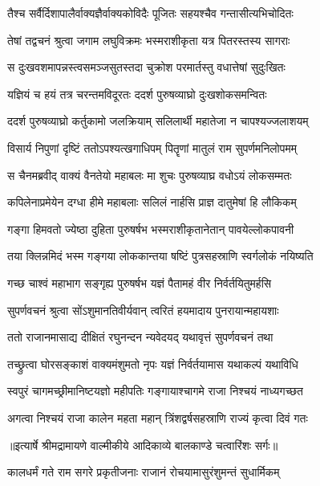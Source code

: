 \twolineshloka
{तैश्च सर्वैर्दिशापालैर्वाक्यज्ञैर्वाक्यकोविदैः}
{पूजितः सहयश्चैव गन्तासीत्यभिचोदितः} %

\twolineshloka
{तेषां तद्वचनं श्रुत्वा जगाम लघुविक्रमः}
{भस्मराशीकृता यत्र पितरस्तस्य सागराः} %

\twolineshloka
{स दुःखवशमापन्नस्त्वसमञ्जसुतस्तदा}
{चुक्रोश परमार्तस्तु वधात्तेषां सुदुःखितः} %

\twolineshloka
{यज्ञियं च हयं तत्र चरन्तमविदूरतः}
{ददर्श पुरुषव्याघ्रो दुःखशोकसमन्वितः} %

\twolineshloka
{ददर्श पुरुषव्याघ्रो कर्तुकामो जलक्रियाम्}
{सलिलार्थी महातेजा न चापश्यज्जलाशयम्} %

\twolineshloka
{विसार्य निपुणां दृष्टिं ततोऽपश्यत्खगाधिपम्}
{पितॄणां मातुलं राम सुपर्णमनिलोपमम्} %

\twolineshloka
{स चैनमब्रवीद् वाक्यं वैनतेयो महाबलः}
{मा शुचः पुरुषव्याघ्र वधोऽयं लोकसम्मतः} %

\twolineshloka
{कपिलेनाप्रमेयेन दग्धा हीमे महाबलाः}
{सलिलं नार्हसि प्राज्ञ दातुमेषां हि लौकिकम्} %

\twolineshloka
{गङ्गा हिमवतो ज्येष्ठा दुहिता पुरुषर्षभ}
{भस्मराशीकृतानेतान् पावयेल्लोकपावनी} %

\twolineshloka
{तया क्लिन्नमिदं भस्म गङ्गया लोककान्तया}
{षष्टिं पुत्रसहस्राणि स्वर्गलोकं नयिष्यति} %

\twolineshloka
{गच्छ चाश्वं महाभाग सङ्गृह्य पुरुषर्षभ}
{यज्ञं पैतामहं वीर निर्वर्तयितुमर्हसि} %

\twolineshloka
{सुपर्णवचनं श्रुत्वा सोंऽशुमानतिवीर्यवान्}
{त्वरितं हयमादाय पुनरायान्महायशाः} %

\twolineshloka
{ततो राजानमासाद्य दीक्षितं रघुनन्दन}
{न्यवेदयद् यथावृत्तं सुपर्णवचनं तथा} %

\twolineshloka
{तच्छ्रुत्वा घोरसङ्काशं वाक्यमंशुमतो नृपः}
{यज्ञं निर्वर्तयामास यथाकल्पं यथाविधि} %

\twolineshloka
{स्वपुरं चागमच्छ्रीमानिष्टयज्ञो महीपतिः}
{गङ्गायाश्चागमे राजा निश्चयं नाध्यगच्छत} %

\twolineshloka
{अगत्वा निश्चयं राजा कालेन महता महान्}
{त्रिंशद्वर्षसहस्राणि राज्यं कृत्वा दिवं गतः} %


{॥इत्यार्षे श्रीमद्रामायणे वाल्मीकीये आदिकाव्ये बालकाण्डे चत्वारिंशः सर्गः॥}


\twolineshloka
{कालधर्मं गते राम सगरे प्रकृतीजनाः}
{राजानं रोचयामासुरंशुमन्तं सुधार्मिकम्} %

